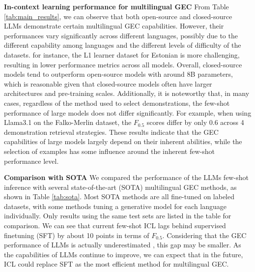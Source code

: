 \noindent \textbf{In-context learning performance for multilingual GEC} \quad From Table \ref{tab:main_results}, we can observe that both open-source and closed-source LLMs demonstrate certain multilingual GEC capabilities. However, their performances vary significantly across different languages, possibly due to the different capability among languages and the different levels of difficulty of the datasets. for instance, the L1 learner dataset for Estonian is more challenging, resulting in lower performance metrics across all models. Overall, closed-source models tend to outperform open-source models with around 8B parameters, which is reasonable given that closed-source models often have larger architectures and pre-training scales. Additionally, it is noteworthy that, in many cases, regardless of the method used to select demonstrations, the few-shot performance of large models does not differ significantly. For example, when using Llama3.1 on the Falko-Merlin dataset, the $F_{0.5}$ scores differ by only 0.6 across 4 demonstration retrieval strategies. These results indicate that the GEC capabilities of large models largely depend on their inherent abilities, while the selection of examples has some influence around the inherent few-shot performance level.

\noindent \textbf{Comparison with SOTA} \quad We compared the performance of the LLMs few-shot inference with several state-of-the-art (SOTA) multilingual GEC methods, as shown in Table \ref{tab:sota}. Most SOTA methods are all fine-tuned on labeled datasets, with some methods tuning a generative model for each language individually. Only results using the same test sets are listed in the table for comparison. We can see that current few-shot ICL lags behind supervised finetuning (SFT) by about 10 points in terms of $F_{0.5}$. Considering that the GEC performance of LLMs is actually underestimated \cite{coyne2023analyzing}, this gap may be smaller. As the capabilities of LLMs continue to improve, we can expect that in the future, ICL could replace SFT as the most efficient method for multilingual GEC.
